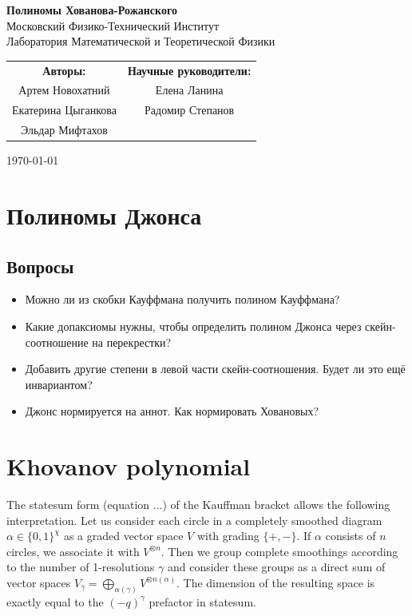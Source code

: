 \documentclass[12pt,a4paper]{article}
\begin{document}
\begin{center}
    \Large \textbf{Полиномы Хованова-Рожанского} \\[1em]
    \small
    Московский Физико-Технический Институт \\[0.5em]
    Лаборатория Математической и Теоретической Физики
\end{center}

\small
\begin{flushright}
\begin{tabular}{c c}
\textbf{Авторы:} & \textbf{Научные руководители:} \\[0.5em]
Артем Новохатний & Елена Ланина \\
Екатерина Цыганкова & Радомир Степанов \\
Эльдар Мифтахов & \\
\end{tabular}

\vspace{1em}

\today
\end{flushright}
\normalsize
\vspace{2em}


\tableofcontents
\vspace{2em}

\section{Полиномы Джонса}

\subsection{Вопросы}
\begin{itemize}
    \item  Можно ли из скобки Кауффмана получить полином Кауффмана?
    \item  Какие допаксиомы нужны, чтобы определить полином Джонса через скейн-соотношение на перекрестки?
    \item  Добавить другие степени в левой части скейн-соотношения. Будет ли это ещё инвариантом?
    \item Джонс нормируется на аннот. Как нормировать Ховановых?
\end{itemize}

\section{Khovanov polynomial}
The statesum form (equation ...) of the Kauffman bracket allows the following interpretation. Let us consider each circle in a completely smoothed diagram $\alpha \in \{0, 1\}^\chi$ as a graded vector space $V$ with grading $\{+, -\}$.  If $\alpha$ consists of $n$ circles, we associate it with $V^{\otimes n}$. Then we group complete smoothings according to the number of 1-resolutions $\gamma$ and consider these groups as a direct sum of vector spaces $V_\gamma = \bigoplus\limits_{\alpha(\gamma)} V^{\otimes n(\alpha)}$. The dimension of the resulting space is exactly equal to the $(-q)^\gamma$ prefactor in statesum.
\end{document}
